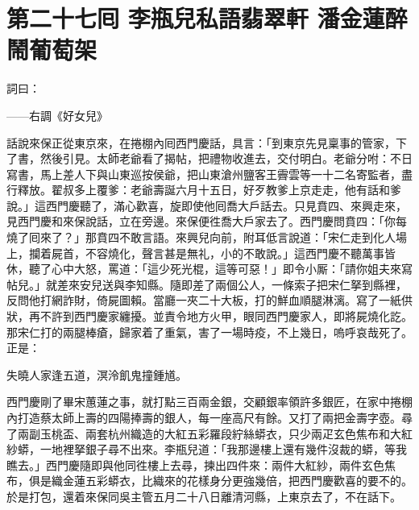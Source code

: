 
\chapter*{第二十七囘 李瓶兒私語翡翠軒 潘金蓮醉鬧葡萄架}


詞曰：

\begin{myquote}

——右調《好女兒》
\end{myquote}

話說來保正從東京來，在捲棚內囘西門慶話，具言：「到東京先見稟事的管家，下了書，然後引見。太師老爺看了揭帖，把禮物收進去，交付明白。老爺分咐：不日寫書，馬上差人下與山東巡按侯爺，把山東滄州鹽客王霽雲等一十二名寄監者，盡行釋放。翟叔多上覆爹：老爺壽誕六月十五日，好歹教爹上京走走，他有話和爹說。」這西門慶聽了，滿心歡喜，旋即使他囘喬大戶話去。只見賁四、來興走來，見西門慶和來保說話，立在旁邊。來保便徃喬大戶家去了。西門慶問賁四：「你每燒了囘來了？」那賁四不敢言語。來興兒向前，附耳低言說道：「宋仁走到化人場上，攔着屍首，不容燒化，聲言甚是無礼，小的不敢說。」這西門慶不聽萬事皆休，聽了心中大怒，罵道：「這少死光棍，這等可惡！」即令小厮：「請你姐夫來寫帖兒。」就差來安兒送與李知縣。隨即差了兩個公人，一條索子把宋仁拏到縣裡，反問他打網詐財，倚屍圖賴。{}當廳一夾二十大板，打的鮮血順腿淋漓。寫了一紙供狀，再不許到西門慶家纏擾。並責令地方火甲，眼同西門慶家人，即將屍燒化訖。那宋仁打的兩腿棒瘡，歸家着了重氣，害了一場時疫，不上幾日，嗚呼哀哉死了。正是：

\begin{myquote}
失曉人家逢五道，溟泠飢鬼撞鍾馗。
\end{myquote}

西門慶剛了畢宋蕙蓮之事，就打點三百兩金銀，交顧銀率領許多銀匠，在家中捲棚內打造蔡太師上壽的四陽捧壽的銀人，每一座高尺有餘。又打了兩把金壽字壺。尋了兩副玉桃盃、兩套杭州織造的大紅五彩羅段紵絲蟒衣，只少兩疋玄色焦布和大紅紗蟒，一地裡拏銀子尋不出來。李瓶兒道：「我那邊樓上還有幾件沒裁的蟒，等我瞧去。」{}西門慶隨即與他同徃樓上去尋，揀出四件來：兩件大紅紗，兩件玄色焦布，俱是織金蓮五彩蟒衣，比織來的花樣身分更強幾倍，把西門慶歡喜的要不的。於是打包，還着來保同吳主管五月二十八日離清河縣，上東京去了，不在話下。

